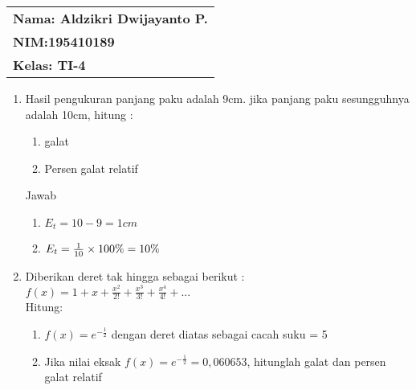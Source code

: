 \documentclass[a4paper,12pt]{article}
\begin{document}
   \null\hfill\begin{tabular}[t]{l@{}}
      \textbf{Nama: Aldzikri Dwijayanto P.} \\
      \textbf{NIM:\@ 195410189} \\
      \textbf{Kelas: TI-4}
   \end{tabular} 

   \begin{enumerate}
      \item Hasil pengukuran panjang paku adalah 9cm. jika panjang paku sesungguhnya adalah 10cm, hitung :
      \begin{enumerate}[label=\alph*.]
            \item galat
            \item Persen galat relatif
      \end{enumerate}

      Jawab
      \begin{enumerate}[label= (\alph*)]
         \item 
         $
            E_{t} = 10 - 9 = 1cm
         $\\

         \item
         $
            E_{t} = \frac{1}{10} \times 100\% \\
            = 10 \%
         $\\[2ex]
      \end{enumerate}

      \item Diberikan deret tak hingga sebagai berikut :\\
         $
            f(x) = 1 + x + \frac{x^{2}}{2!} +  \frac{x^{3}}{3!} + \frac{x^{4}}{4!} + ...
         $\\
         Hitung:
         \begin{enumerate}[label=\alph*.]
            \item 
               $
               f(x) = e ^{-\frac{1}{2}}
               $
               dengan deret diatas sebagai cacah suku = 5

            \item Jika nilai eksak $f(x) = e ^{-\frac{1}{2}} = 0,060653$, hitunglah galat dan persen galat relatif
         \end{enumerate}
         

\end{enumerate}
\end{document}
